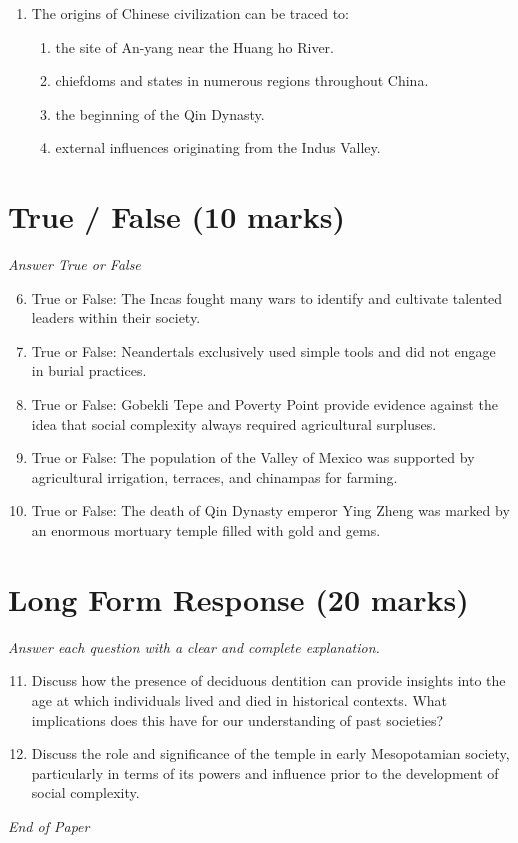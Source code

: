 \documentclass[12pt]{article}
\begin{document}
\begin{enumerate}[label=\arabic*.]
\begin{enumerate}[label=(\alph*)]
    \item catastrophism
    \item uniformitarianism
    \item unilineal evolution
\end{enumerate}
\item The origins of Chinese civilization can be traced to:
\begin{enumerate}[label=(\alph*)]
    \item the site of An-yang near the Huang ho River.
    \item chiefdoms and states in numerous regions throughout China.
    \item the beginning of the Qin Dynasty.
    \item external influences originating from the Indus Valley.
\end{enumerate}
\end{enumerate}

\section*{True / False (10 marks)}
\textit{Answer True or False}
\begin{enumerate}[label=\arabic*.]
\setcounter{enumi}{5}
\item True or False: The Incas fought many wars to identify and cultivate talented leaders within their society.
\item True or False: Neandertals exclusively used simple tools and did not engage in burial practices.
\item True or False: Gobekli Tepe and Poverty Point provide evidence against the idea that social complexity always required agricultural surpluses.
\item True or False: The population of the Valley of Mexico was supported by agricultural irrigation, terraces, and chinampas for farming.
\item True or False: The death of Qin Dynasty emperor Ying Zheng was marked by an enormous mortuary temple filled with gold and gems.
\end{enumerate}

\section*{Long Form Response (20 marks)}
\textit{Answer each question with a clear and complete explanation.}
\begin{enumerate}[label=\arabic*.]
\setcounter{enumi}{10}
\item Discuss how the presence of deciduous dentition can provide insights into the age at which individuals lived and died in historical contexts. What implications does this have for our understanding of past societies?
\item Discuss the role and significance of the temple in early Mesopotamian society, particularly in terms of its powers and influence prior to the development of social complexity.
\end{enumerate}

\vfill
\noindent\textit{End of Paper}
\end{document}
